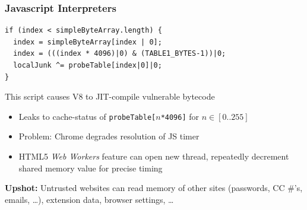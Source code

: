 \documentclass[10pt]{beamer}
\begin{document}

\begin{frame}[fragile]

\frametitle{Javascript Interpreters}

\begin{lstlisting}[basicstyle=\small,style=customjava]
if (index < simpleByteArray.length) {
  index = simpleByteArray[index | 0];
  index = (((index * 4096)|0) & (TABLE1_BYTES-1))|0;
  localJunk ^= probeTable[index|0]|0;
}
\end{lstlisting}

\vspace*{1em}
This script causes V8 to JIT-compile vulnerable bytecode
\pause
\begin{itemize}
  \item Leaks to cache-status of \texttt{probeTable[}$n$\texttt{*4096]} for $n\in[0..255]$
  \pause\item Problem: Chrome degrades resolution of JS timer
  \pause\item HTML5 \emph{Web Workers} feature can open new thread, repeatedly decrement shared memory value for precise timing
\end{itemize}

\pause
\begin{center}
\textbf{Upshot:} Untrusted websites can read memory of other sites (passwords, CC \#'s, emails, \ldots), extension data, browser settings, \ldots
\end{center}

\end{frame}

\end{document}
